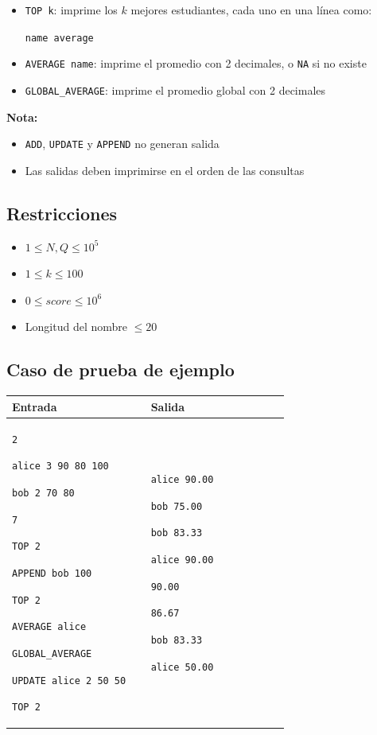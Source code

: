 \documentclass[11pt,a4paper]{article}
\newenvironment{sample}[2]{
  \begin{tcolorbox}[title=Prueba \##1, colback=white, colframe=black, sharp corners,
    fonttitle=\bfseries, breakable]
    \begin{tabular}{|p{0.45\linewidth}|p{0.45\linewidth}|}
      \hline
      \textbf{Entrada} & \textbf{Salida} \\
      \hline
      }{\\ \hline
    \end{tabular}
  \end{tcolorbox}
}
\begin{document}
\begin{itemize}
    \item \texttt{TOP k}: imprime los $k$ mejores estudiantes, cada uno en una línea como:
    
    \texttt{name average}
    
    \item \texttt{AVERAGE name}: imprime el promedio con 2 decimales, o \texttt{NA} si no existe

    \item \texttt{GLOBAL\_AVERAGE}: imprime el promedio global con 2 decimales
\end{itemize}

\textbf{Nota:}
\begin{itemize}
    \item \texttt{ADD}, \texttt{UPDATE} y \texttt{APPEND} no generan salida
    \item Las salidas deben imprimirse en el orden de las consultas
\end{itemize}

\subsection*{Restricciones}

\begin{itemize}
    \item $1 \leq N, Q \leq 10^5$
    \item $1 \leq k \leq 100$
    \item $0 \leq score \leq 10^6$
    \item Longitud del nombre $\leq 20$
\end{itemize}

\subsection*{Caso de prueba de ejemplo}

\begin{sample}{1}{}
\texttt{2}

\texttt{alice 3 90 80 100}

\texttt{bob 2 70 80}

\texttt{7}

\texttt{TOP 2}

\texttt{APPEND bob 100}

\texttt{TOP 2}

\texttt{AVERAGE alice}

\texttt{GLOBAL\_AVERAGE}

\texttt{UPDATE alice 2 50 50}

\texttt{TOP 2}
&
\texttt{alice 90.00}

\texttt{bob 75.00}

\texttt{bob 83.33}

\texttt{alice 90.00}

\texttt{90.00}

\texttt{86.67}

\texttt{bob 83.33}

\texttt{alice 50.00}
\end{sample}
\end{document}
